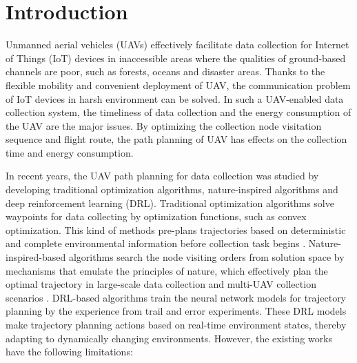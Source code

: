 \documentclass[conference]{IEEEtran}
\begin{document}
\section{Introduction}
Unmanned aerial vehicles (UAVs) effectively facilitate data collection for Internet of Things (IoT) devices in inaccessible areas where the qualities of ground-based channels are poor, such as forests, oceans and disaster areas. Thanks to the flexible mobility and convenient deployment of UAV, the communication problem of IoT devices in harsh environment can be solved. In such a UAV-enabled data collection system, the timeliness of data collection and the energy consumption of the UAV are the major issues. By optimizing the collection node visitation sequence and flight route, the path planning of UAV has effects on the collection time and energy consumption. 

In recent years, the UAV path planning for data collection was studied by developing traditional optimization algorithms, nature-inspired algorithms and deep reinforcement learning (DRL). Traditional optimization algorithms solve waypoints for data collecting by optimization functions, such as convex optimization. This kind of methods pre-plans trajectories based on deterministic and complete environmental information before collection task begins \cite{YLi23,JLi20,MLi23}. Nature-inspired-based algorithms search the node visiting orders from solution space by mechanisms that emulate the principles of nature, which effectively plan the optimal trajectory in large-scale data collection and multi-UAV collection scenarios \cite{TWang22}. DRL-based algorithms train the neural network models for trajectory planning by the experience from trail and error experiments. These DRL models make trajectory planning actions based on real-time environment states, thereby adapting to dynamically changing environments. However, the existing works have the following limitations: 
\end{document}
